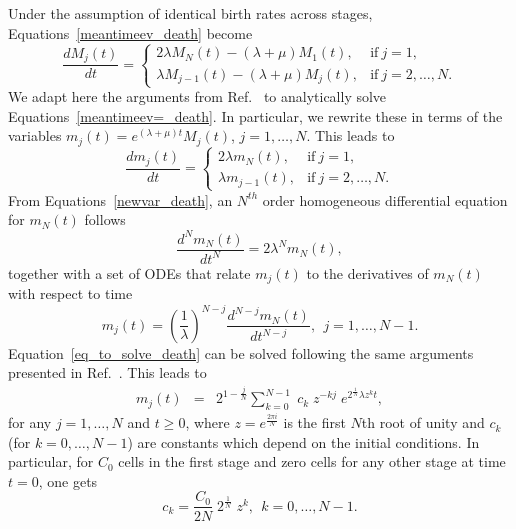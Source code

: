 \documentclass[10pt]{article}
\numberwithin{equation}{section}
\begin{document}
Under the assumption of identical birth rates across stages, Equations~\eqref{meantimeev_death} become
\begin{equation} \label{meantimeev=_death}
\frac{dM_j(t)}{dt}=
\begin{cases}
2 \lambda M_N(t) - \left(\lambda + \mu\right) M_1(t), & \text{if} \ j=1, 
\\
\lambda M_{j-1}(t) - \left(\lambda + \mu\right) M_j(t), & \text{if} \ j=2, \ldots, N.
\end{cases}
\end{equation}
 We adapt here the arguments from Ref.~\cite{yates} to analytically solve Equations~\eqref{meantimeev=_death}. In particular, we rewrite these in terms of the variables $m_j(t) = e^{(\lambda + \mu)t} M_j(t)$, $j = 1, \ldots, N$.
 This leads to
\begin{equation} \label{newvar_death}
\frac{dm_j(t)}{dt}=
\begin{cases}
2 \lambda m_N(t), & \text{if} \ j=1, 
\\
\lambda m_{j-1}(t), & \text{if} \ j=2, \ldots, N.
\end{cases}
\end{equation}
 From Equations~\eqref{newvar_death}, an $N^{th}$ order homogeneous differential equation for $m_N(t)$ follows
\begin{equation} \label{eq_to_solve_death}
\frac{d^N m_N(t)}{dt^N} = 2 \lambda^N m_N(t),
\end{equation} 
together with a set of ODEs that relate $m_j(t)$ to the derivatives of $m_N(t)$ with respect to time
\begin{equation} \label{relation_death}
m_j(t) = \left(\frac{1}{\lambda}\right)^{N-j} \frac{d^{N-j}m_N(t)}{dt^{N-j}}, \ \
j=1, \ldots, N-1.
\end{equation}
Equation~\eqref{eq_to_solve_death}
can be solved following the same arguments presented in Ref.~\cite{yates}. This leads to 
\begin{eqnarray*}
m_j(t) &=&
2^{1-\frac{j}{N}} \sum_{k=0}^{N-1} 
\; c_k \; z^{-kj} \; e^{2^{\frac{1}{N}} \lambda z^k t},
\end{eqnarray*}
 for any $j=1,\ldots,N$ and $t\geq0$, where $z=e^{\frac{2 \pi i}{N}}$ is the first $N$th root of  unity and $c_k$ (for $k=0, \ldots, N-1$) are constants which depend on the initial conditions. In particular, for $C_0$ cells in the first stage and zero cells for any other stage at time $t=0$, one gets
\begin{equation*}
c_k = \frac{C_0}{2N} \; 2^{\frac{1}{N}} \; z^k, \ \ k=0,\ldots,N-1.
\end{equation*}
\end{document}
